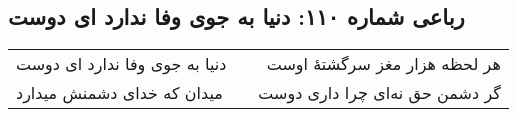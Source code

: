 \begin{center}
\section*{رباعی شماره ۱۱۰: دنیا به جوی وفا ندارد ای دوست}
\label{sec:sh110}
\begin{longtable}{l p{0.5cm} r}
دنیا به جوی وفا ندارد ای دوست
&&
هر لحظه هزار مغز سرگشتهٔ اوست
\\
میدان که خدای دشمنش میدارد
&&
گر دشمن حق نه‌ای چرا داری دوست
\\
\end{longtable}
\end{center}
